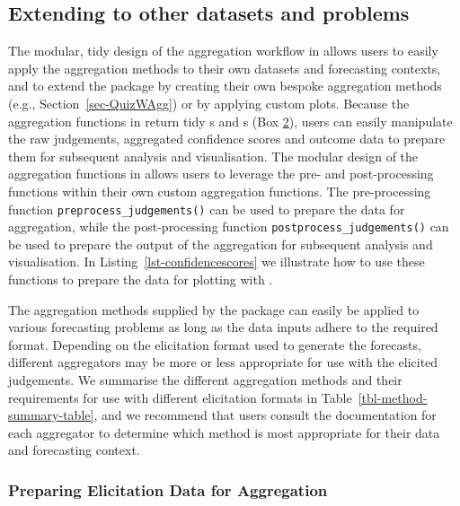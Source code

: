 \documentclass[
  11pt,
  a4paper,
]{article}
\begin{document}
\subsection{\texorpdfstring{Extending  to other datasets
and
problems}{Extending  to other datasets and problems}}\label{sec-green-turtle}

The modular, tidy design of the aggregation workflow in 
allows users to easily apply the aggregation methods to their own
datasets and forecasting contexts, and to extend the package by creating
their own bespoke aggregation methods (e.g., Section~\ref{sec-QuizWAgg})
or by applying custom plots. Because the aggregation functions in
 return tidy s and s (Box
\hyperref[aggWorkflow]{2}), users can easily manipulate the raw
judgements, aggregated confidence scores and outcome data to prepare
them for subsequent analysis and visualisation. The modular design of
the aggregation functions in  allows users to leverage the
pre- and post-processing functions within their own custom aggregation
functions. The pre-processing function \texttt{preprocess\_judgements()}
can be used to prepare the data for aggregation, while the
post-processing function \texttt{postprocess\_judgements()} can be used
to prepare the output of the aggregation for subsequent analysis and
visualisation. In Listing~\ref{lst-confidencescores} we illustrate how
to use these functions to prepare the data for plotting with
.

The aggregation methods supplied by the  package can
easily be applied to various forecasting problems as long as the data
inputs adhere to the required format. Depending on the elicitation
format used to generate the forecasts, different aggregators may be more
or less appropriate for use with the elicited judgements. We summarise
the different aggregation methods and their requirements for use with
different elicitation formats in Table~\ref{tbl-method-summary-table},
and we recommend that users consult the documentation for each
aggregator to determine which method is most appropriate for their data
and forecasting context.

\subsubsection{Preparing Elicitation Data for
Aggregation}\label{preparing-elicitation-data-for-aggregation}
\end{document}
